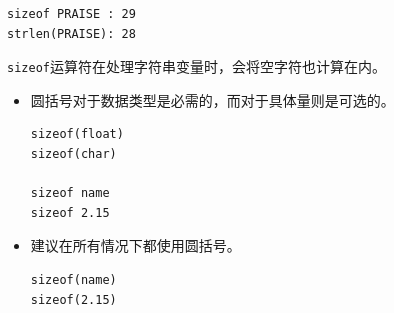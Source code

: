 \begin{frame}[fragile]
\begin{lstlisting}[backgroundcolor=\color{red!10}]
sizeof PRAISE : 29
strlen(PRAISE): 28
\end{lstlisting}

\lstinline|sizeof|运算符在处理字符串变量时，会将空字符也计算在内。
\end{frame}

\begin{frame}[fragile]
\begin{itemize}
\item 圆括号对于数据类型是必需的，而对于具体量则是可选的。
\begin{lstlisting}[backgroundcolor=\color{red!10}]
sizeof(float)
sizeof(char)

sizeof name
sizeof 2.15
\end{lstlisting}
\item 建议在所有情况下都使用圆括号。
\begin{lstlisting}[backgroundcolor=\color{red!10}]
sizeof(name)
sizeof(2.15)
\end{lstlisting}
\end{itemize}
\end{frame}

